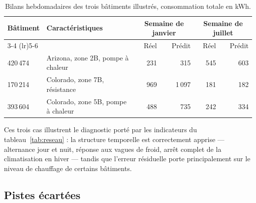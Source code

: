 \documentclass[11pt,a4paper]{article}
\begin{document}
\begin{table}[htbp]
  \centering
  \caption{Bilans hebdomadaires des trois bâtiments illustrés, consommation totale en kWh.}
  \label{tab:bilans}
  \begin{tabular}{llrrrr}
    \toprule
    Bâtiment & Caractéristiques
      & \multicolumn{2}{c}{Semaine de janvier} & \multicolumn{2}{c}{Semaine de juillet} \\
    \cmidrule(lr){3-4} \cmidrule(lr){5-6}
      & & Réel & Prédit & Réel & Prédit \\
    \midrule
    420\,474 & Arizona, zone 2B, pompe à chaleur  & 231 & 315    & 545 & 603 \\
    170\,214 & Colorado, zone 7B, résistance      & 969 & 1\,097 & 181 & 182 \\
    393\,604 & Colorado, zone 5B, pompe à chaleur & 488 & 735    & 242 & 334 \\
    \bottomrule
  \end{tabular}
\end{table}

Ces trois cas illustrent le diagnostic porté par les indicateurs du tableau~\ref{tab:reseau} :
la structure temporelle est correctement apprise — alternance jour et nuit, réponse aux
vagues de froid, arrêt complet de la climatisation en hiver — tandis que l'erreur résiduelle
porte principalement sur le niveau de chauffage de certains bâtiments.

\clearpage

\subsection{Pistes écartées}
\end{document}
